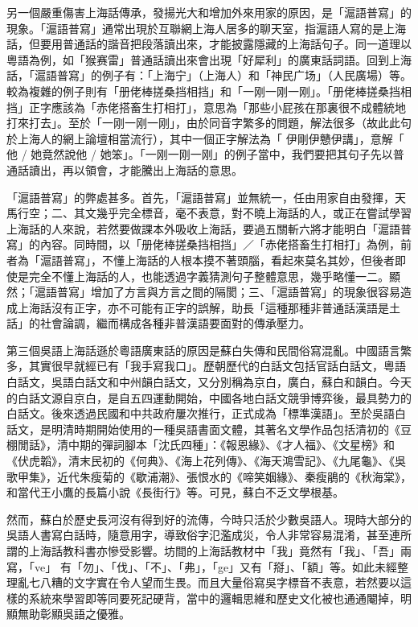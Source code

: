 另一個嚴重傷害上海話傳承，發揚光大和增加外來用家的原因，是「滬語普寫」的現象。「滬語普寫」通常出現於互聯網上海人居多的聊天室，指滬語人寫的是上海話，但要用普通話的諧音把段落讀出來，才能披露隱藏的上海話句子。同一道理以粵語為例，如「猴赛雷」普通話讀出來會出現「好犀利」的廣東話詞語。回到上海話，「滬語普寫」的例子有：「上海宁」（上海人）和「神民广场」（人民廣場）等。較為複雜的例子則有「册佬棒搓桑挡相挡」和「一刚一刚一刚」。「册佬棒搓桑挡相挡」正字應該為「赤佬搭畜生打相打」，意思為「那些小屁孩在那裏很不成體統地打來打去」。至於「一刚一刚一刚」，由於同音字繁多的問題，解法很多（故此此句於上海人的網上論壇相當流行），其中一個正字解法為「 伊剛伊戇伊講」，意解「 他 / 她竟然說他 / 她笨」。「一刚一刚一刚」的例子當中，我們要把其句子先以普通話讀出，再以領會，才能騰出上海話的意思。

「滬語普寫」的弊處甚多。首先，「滬語普寫」並無統一，任由用家自由發揮，天馬行空；二、其文幾乎完全標音，毫不表意，對不曉上海話的人，或正在嘗試學習上海話的人來說，若然要做課本外吸收上海話，要過五關斬六將才能明白「滬語普寫」的內容。同時間，以「册佬棒搓桑挡相挡」／「赤佬搭畜生打相打」為例，前者為「滬語普寫」，不懂上海話的人根本摸不著頭腦，看起來莫名其妙，但後者即使是完全不懂上海話的人，也能透過字義猜測句子整體意思，幾乎略懂一二。顯然；「滬語普寫」增加了方言與方言之間的隔閡；三、「滬語普寫」的現象很容易造成上海話沒有正字，亦不可能有正字的誤解，助長「這種那種非普通話漢語是土話」的社會論調，繼而構成各種非普漢語要面對的傳承壓力。

第三個吳語上海話遜於粵語廣東話的原因是蘇白失傳和民間俗寫混亂。中國語言繁多，其實很早就經已有「我手寫我口」。歷朝歷代的白話文包括官話白話文，粵語白話文，吳語白話文和中州韻白話文，又分別稱為京白，廣白，蘇白和韻白。今天的白話文源自京白，是自五四運動開始，中國各地白話文競爭博弈後，最具勢力的白話文。後來透過民國和中共政府屢次推行，正式成為「標準漢語」。至於吳語白話文，是明清時期開始使用的一種吳語書面文體，其著名文學作品包括清初的《豆棚閒話》，清中期的彈詞腳本「沈氏四種」：《報恩緣》、《才人福》、《文星榜》和《伏虎韜》，清末民初的《何典》、《海上花列傳》、《海天鴻雪記》、《九尾龜》、《吳歌甲集》，近代朱瘦菊的《歇浦潮》、張恨水的《啼笑姻緣》、秦瘦鵑的《秋海棠》，和當代王小鷹的長篇小說《長街行》等。可見，蘇白不乏文學根基。

然而，蘇白於歷史長河沒有得到好的流傳，今時只活於少數吳語人。現時大部分的吳語人書寫白話時，隨意用字，導致俗字氾濫成災，令人非常容易混淆，甚至連所謂的上海話教科書亦慘受影響。坊間的上海話教材中「我」竟然有「我」、「吾」兩寫，「ve」 有「勿」、「伐」、「不」、「弗」，「ge」又有「搿」、「額」等。如此未經整理亂七八糟的文字實在令人望而生畏。而且大量俗寫吳字標音不表意，若然要以這樣的系統來學習即等同要死記硬背，當中的邏輯思維和歷史文化被也通通閹掉，明顯無助彰顯吳語之優雅。

